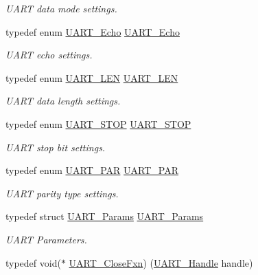 \begin{DoxyCompactItemize}
\begin{DoxyCompactList}\small\item\em U\+A\+R\+T data mode settings. \end{DoxyCompactList}\item 
typedef enum \hyperlink{_u_a_r_t_8h_aac6a03c2e1d76f53e1d9d923dcdc24f2}{U\+A\+R\+T\+\_\+\+Echo} \hyperlink{_u_a_r_t_8h_a5372f2a3d7f68aa38ea560ed5fe520a9}{U\+A\+R\+T\+\_\+\+Echo}
\begin{DoxyCompactList}\small\item\em U\+A\+R\+T echo settings. \end{DoxyCompactList}\item 
typedef enum \hyperlink{_u_a_r_t_8h_adf245d5f10db0abcbd8ad62a0d80c694}{U\+A\+R\+T\+\_\+\+L\+E\+N} \hyperlink{_u_a_r_t_8h_a9290f6d71215e218998106ddff83911b}{U\+A\+R\+T\+\_\+\+L\+E\+N}
\begin{DoxyCompactList}\small\item\em U\+A\+R\+T data length settings. \end{DoxyCompactList}\item 
typedef enum \hyperlink{_u_a_r_t_8h_a176b71ca19bc13d7534fa30fc18c2243}{U\+A\+R\+T\+\_\+\+S\+T\+O\+P} \hyperlink{_u_a_r_t_8h_a7f2ba2e85c63055e158e5e4b51b1f9fd}{U\+A\+R\+T\+\_\+\+S\+T\+O\+P}
\begin{DoxyCompactList}\small\item\em U\+A\+R\+T stop bit settings. \end{DoxyCompactList}\item 
typedef enum \hyperlink{_u_a_r_t_8h_ac70b5aa75500b8c45a51ec560deccfc4}{U\+A\+R\+T\+\_\+\+P\+A\+R} \hyperlink{_u_a_r_t_8h_a12584e934e85933c6b20b59b0ac5c343}{U\+A\+R\+T\+\_\+\+P\+A\+R}
\begin{DoxyCompactList}\small\item\em U\+A\+R\+T parity type settings. \end{DoxyCompactList}\item 
typedef struct \hyperlink{struct_u_a_r_t___params}{U\+A\+R\+T\+\_\+\+Params} \hyperlink{_u_a_r_t_8h_a533d172a10c22e1e5b94e9d0a055d882}{U\+A\+R\+T\+\_\+\+Params}
\begin{DoxyCompactList}\small\item\em U\+A\+R\+T Parameters. \end{DoxyCompactList}\item 
typedef void($\ast$ \hyperlink{_u_a_r_t_8h_ae08ff15291bd6b21cb4e2eb1fce164a6}{U\+A\+R\+T\+\_\+\+Close\+Fxn}) (\hyperlink{_u_a_r_t_8h_a13cc669fae768d8212e6491ce71b28af}{U\+A\+R\+T\+\_\+\+Handle} handle)

\end{DoxyCompactItemize}
